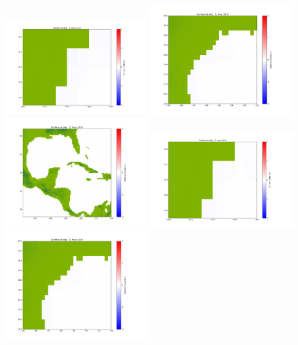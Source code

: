 \documentclass[11pt]{article}
\begin{document}
\vskip 10pt 
\includegraphics[width=0.475\textwidth]{frame0090fig1001.png}
\includegraphics[width=0.475\textwidth]{frame0090fig1002.png}
\vskip 10pt 
\includegraphics[width=0.475\textwidth]{frame0090fig1003.png}
\vskip 10pt 
\includegraphics[width=0.475\textwidth]{frame0091fig1001.png}
\includegraphics[width=0.475\textwidth]{frame0091fig1002.png}
\end{document}
